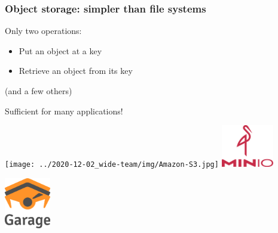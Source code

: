 \documentclass[aspectratio=169]{beamer}
\begin{document}
\begin{frame}
	\frametitle{Object storage: simpler than file systems}

	\begin{minipage}{6cm}
		Only two operations:
		\vspace{1em}
		\begin{itemize}
			\item Put an object at a key
				\vspace{1em}
			\item Retrieve an object from its key
		\end{itemize}
		\vspace{1em}
		{\footnotesize (and a few others)}

		\vspace{1em}
		Sufficient for many applications!
	\end{minipage}
	\hfill
	\begin{minipage}{8cm}
		\begin{center}
			\vspace{2em}
			\texttt{[image: ../2020-12-02\_wide-team/img/Amazon-S3.jpg]}
			\hspace{2em}
			\includegraphics[height=5em]{assets/minio.png}

			\vspace{2em}
			\includegraphics[height=6em]{../../logo/garage_hires_crop.png}
		\end{center}
		\vspace{1em}
	\end{minipage}
\end{frame}
\end{document}
